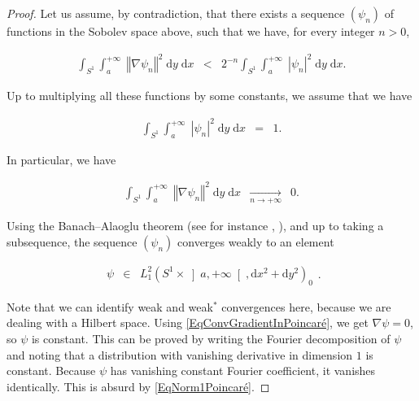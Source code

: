 \documentclass{jams-l}
\theoremstyle{definition}
\theoremstyle{remark}
\numberwithin{equation}{section}
\begin{document}
        \begin{proof}
        
            Let us assume, by contradiction, that there exists a sequence $\left( \psi_n \right)$ of functions in the Sobolev space above, such that we have, for every integer $n > 0$,
            
            \[ \begin{array}{lll}
                    \int_{S^1} \int_{a}^{+ \infty} \; \left \Vert \nabla \psi_n \right \Vert^2 \; \mathrm{d}y \; \mathrm{d}x & < & 2^{-n} \int_{S^1} \int_a^{+ \infty} \; \left \vert \psi_n \right \vert^2 \; \mathrm{d}y \; \mathrm{d}x.
                \end{array} \]
            
            \noindent Up to multiplying all these functions by some constants, we assume that we have
            
            \begin{equation}
            \label{EqNorm1Poincaré}
                \begin{array}{lll}
                    \int_{S^1} \int_a^{+ \infty} \; \left \vert \psi_n \right \vert^2 \; \mathrm{d}y \; \mathrm{d}x & = & 1.
                \end{array}
            \end{equation}
            
            \noindent In particular, we have
            
            \begin{equation}
            \label{EqConvGradientInPoincaré}
                \begin{array}{lll}
                    \int_{S^1} \int_{a}^{+ \infty} \; \left \Vert \nabla \psi_n \right \Vert^2 \; \mathrm{d}y \; \mathrm{d}x & \underset{n \rightarrow + \infty}{\longrightarrow} & 0.
                \end{array}
            \end{equation}
            
            \noindent Using the Banach--Alaoglu theorem (see for instance \cite[Thm 1.3.17]{MR1157815}, \cite[Sec. V.3]{MR1070713}), and up to taking a subsequence, the sequence $\left( \psi_n \right)$ converges weakly to an element
            
            \[ \begin{array}{lll}
                    \psi & \in & L_1^2 \left( S^1 \times \left] a, + \infty \right[, \mathrm{d}x^2 + \mathrm{d}y^2 \right)_0
                \end{array} . \]
            
            \noindent Note that we can identify weak and weak$^{\ast}$ convergences here, because we are dealing with a Hilbert space. Using \eqref{EqConvGradientInPoincaré}, we get $\nabla \psi = 0$, so $\psi$ is constant. This can be proved by writing the Fourier decomposition of $\psi$ and noting that a distribution with vanishing derivative in dimension $1$ is constant. Because $\psi$ has vanishing constant Fourier coefficient, it vanishes identically. This is absurd by \eqref{EqNorm1Poincaré}.
        
        \end{proof}
        
\end{document}
